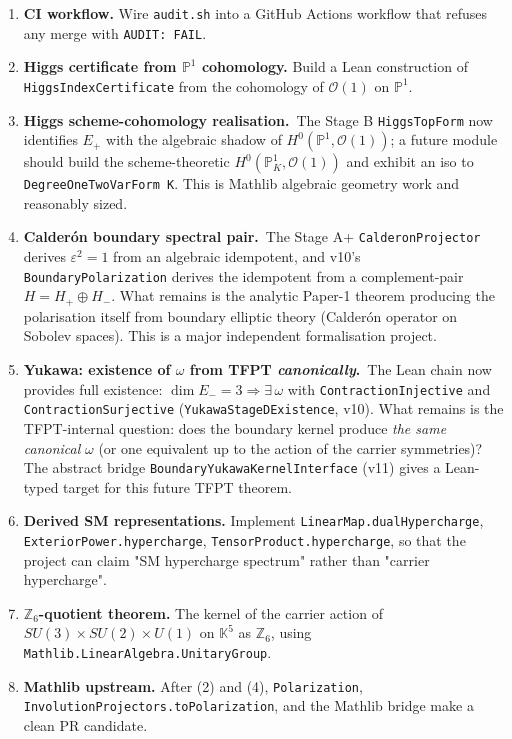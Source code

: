 \begin{enumerate}[leftmargin=1.6em, itemsep=2pt]
\item \textbf{CI workflow.}
    Wire \texttt{audit.sh} into a GitHub Actions workflow that
    refuses any merge with \texttt{AUDIT:\ FAIL}.

\item \textbf{Higgs certificate from $\mathbb P^1$ cohomology.}
    Build a Lean construction of \texttt{HiggsIndexCertificate}
    from the cohomology of $\mathcal O(1)$ on $\mathbb P^1$.

\item \textbf{Higgs scheme-cohomology realisation.}\ The
    Stage B \texttt{HiggsTopForm} now identifies $E_+$ with
    the algebraic shadow of $H^0(\mathbb P^1, \mathcal O(1))$;
    a future module should build the scheme-theoretic
    $H^0(\mathbb P^1_K, \mathcal O(1))$ and exhibit an iso to
    \texttt{DegreeOneTwoVarForm K}. This is Mathlib algebraic
    geometry work and reasonably sized.
\item \textbf{Calderón boundary spectral pair.}\ The Stage A+
    \texttt{CalderonProjector} derives $\varepsilon^2 = 1$
    from an algebraic idempotent, and v10's
    \texttt{BoundaryPolarization} derives the idempotent from
    a complement-pair $H = H_+ \oplus H_-$. What remains is the
    analytic Paper-1 theorem producing the polarisation itself
    from boundary elliptic theory (Calder\'on operator on
    Sobolev spaces). This is a major independent
    formalisation project.
\item \textbf{Yukawa: existence of $\omega$ from TFPT
    \emph{canonically}.}\ The Lean chain now provides full
    existence:
    $\dim E_- = 3 \Rightarrow \exists\,\omega$ with
    \texttt{ContractionInjective} and
    \texttt{ContractionSurjective}
    (\texttt{YukawaStageDExistence}, v10). What remains is
    the TFPT-internal question: does the boundary kernel
    produce \emph{the same canonical} $\omega$ (or one
    equivalent up to the action of the carrier symmetries)?
    The abstract bridge
    \texttt{BoundaryYukawaKernelInterface} (v11) gives a
    Lean-typed target for this future TFPT theorem.

\item \textbf{Derived SM representations.}
    Implement
    \texttt{LinearMap.dualHypercharge},
    \texttt{ExteriorPower.hypercharge},
    \texttt{TensorProduct.hypercharge},
    so that the project can claim "SM hypercharge spectrum"
    rather than "carrier hypercharge".

\item \textbf{$\mathbb Z_6$-quotient theorem.}
    The kernel of the carrier action of
    $SU(3)\times SU(2)\times U(1)$ on $\mathbb K^5$ as $\mathbb Z_6$,
    using \texttt{Mathlib.LinearAlgebra.UnitaryGroup}.

\item \textbf{Mathlib upstream.}
    After (2) and (4), \texttt{Polarization},
    \texttt{InvolutionProjectors.toPolarization}, and the
    Mathlib bridge make a clean PR candidate.
\end{enumerate}

